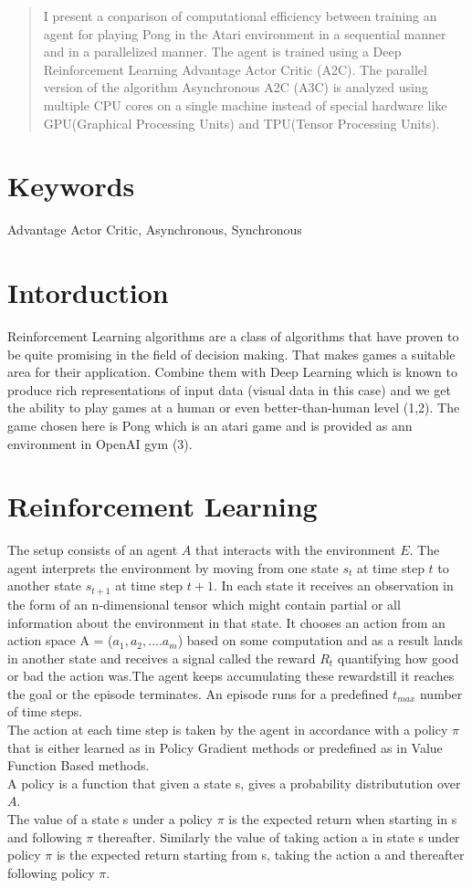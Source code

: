 \documentclass[12pt,a4]{article}
\begin{document}
\pagestyle{empty}
\begin{abstract}
I present a conparison of computational efficiency between training an agent for playing Pong in the Atari environment in a sequential manner and in a parallelized manner. The agent is trained using a Deep Reinforcement Learning Advantage Actor Critic (A2C). The parallel version of the algorithm Asynchronous A2C (A3C) is analyzed using multiple CPU cores on a single machine instead of special hardware like GPU(Graphical Processing Units) and TPU(Tensor Processing Units).
\end{abstract}

\section*{Keywords}
Advantage Actor Critic, Asynchronous, Synchronous

\section*{Intorduction}
Reinforcement Learning algorithms are a class of algorithms that have proven to be quite promising in the field of decision making. That makes games a suitable area for their application. Combine them with Deep Learning which is known to produce rich representations of input data (visual data in this case) and we get the ability to play games at a human or even  better-than-human level (1,2). The game chosen here is Pong which is an atari game and is provided as ann environment in OpenAI gym (3).

\section*{Reinforcement Learning}
The setup consists of an agent \(A\) that interacts with the environment \(E\). The agent interprets the environment by moving from one state \(s_{t}\) at time step \(t\) to another state \(s_{t+1}\) at time step \(t+1\). In each state it receives an observation in the form of an n-dimensional tensor which might contain partial or all information about the environment in that state. It chooses an action from an action space A = (\(a_{1},a_{2},....a_{m}\)) based on some computation and as a result lands in another state and receives a signal called the reward \(R_{t}\) quantifying how good or bad the action was.The agent keeps accumulating these rewardstill it reaches the goal or the episode terminates. An episode runs for a predefined \(t_{max}\) number of time steps.\\
The action at each time step is taken by the agent in accordance with a policy \(\pi\) that is either learned as in Policy Gradient methods or predefined as in Value Function Based methods.\\
A policy is a function that given a state s, gives a probability distributution over \(A\).\\
The value of a state s under a policy \(\pi\) is the expected return when starting in s and following \(\pi\) thereafter. Similarly the value of taking action a in state s under policy \(\pi\) is the expected return starting from s, taking the action a and thereafter following policy \(\pi\).
\end{document}
